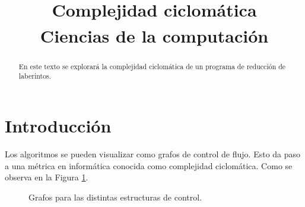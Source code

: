 \documentclass[conference]{IEEEtran}
\begin{document}
\title{Complejidad ciclomática\\
{\footnotesize \textsuperscript{}Ciencias de la computación}
}

\author{

}


\maketitle

\begin{abstract}
En este texto se explorará la complejidad ciclomática de un programa de reducción de laberintos.
\end{abstract}

\section{Introducción}

Los algoritmos se pueden visualizar como grafos de control de flujo. Esto da paso a una métrica en informática conocida como complejidad ciclomática. Como se observa en la Figura \ref{fig:control_flujo}.

\begin{figure}[H]
	\caption{\label{fig:control_flujo} Grafos para las distintas estructuras de control.}
\end{figure}

\printbibliography
\end{document}

